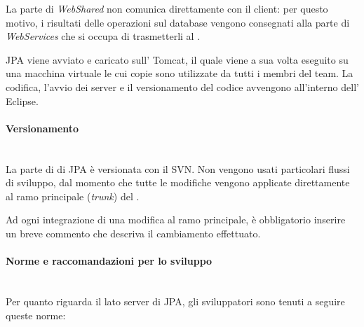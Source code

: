 La parte di \emph{WebShared} non comunica direttamente con il client: per
questo motivo, i risultati delle operazioni sul database vengono consegnati
alla parte di \emph{WebServices} che si occupa di trasmetterli al \FREND{}.

JPA viene avviato e caricato sull' Tomcat, il quale
viene a sua volta eseguito su una macchina virtuale le cui copie sono
utilizzate da tutti i membri del team.
La codifica, l'avvio dei server e il versionamento del codice avvengono
all'interno dell' Eclipse.

\paragraph{Versionamento} \mbox{} \\

La parte di \BKEND{} di JPA è versionata con il  SVN. Non vengono usati
particolari flussi di sviluppo, dal momento che tutte le modifiche vengono
applicate direttamente al ramo principale (\emph{trunk}) del
.

Ad ogni integrazione di una modifica al ramo principale, è obbligatorio
inserire un breve commento che descriva il cambiamento effettuato.

\paragraph{Norme e raccomandazioni per lo sviluppo} \mbox{} \\

Per quanto riguarda il lato server di JPA, gli sviluppatori sono tenuti a
seguire queste norme:

